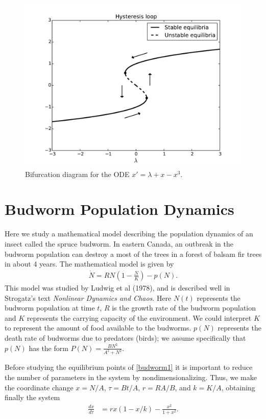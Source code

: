 \begin{figure}[ht]
\centering
\includegraphics[width=\textwidth]{HysteresisBifurcation.pdf}
\caption{Bifurcation diagram for the ODE $x' = \lambda + x - x^3$. }
\label{bifurcation:hysteresis}
\end{figure}


\section{Budworm Population Dynamics}
Here we study a mathematical model describing the population dynamics of an insect called the spruce budworm. In eastern Canada, an outbreak in the budworm population can destroy a most of the trees in a forest of balsam fir trees in about 4 years.  The mathematical model is given by 
\begin{align}
\dot{N} = RN\left(1 - \frac{N}{K}\right) - p(N). \label{budworm1}
\end{align}
This model was studied by Ludwig et al (1978), and is described well in Strogatz's text \emph{Nonlinear Dynamics and Chaos}.  Here $N(t)$ represents the budworm population at time $t$, $R$ is the growth rate of the budworm population and $K$ represents the carrying capacity of the environment.  We could interpret $K$ to represent the amount of food available to the budworms. 
$p(N)$ represents the death rate of budworms due to predators (birds); we assume specifically that $p(N)$ has the form $P(N) = \frac{BN^2}{A^2 + N^2}$.

Before studying the equilibrium points of \eqref{budworm1} it is important to reduce the number of parameters in the system by nondimensionalizing.  Thus, we make the coordinate change $x = N/A$, $\tau = Bt/A$, $r = RA/B$, and $k = K/A$, obtaining finally the system 
\begin{align}
	\frac{dx}{d \tau} &= rx(1-x/k) - \frac{x^2}{1+x^2}.
\end{align}


